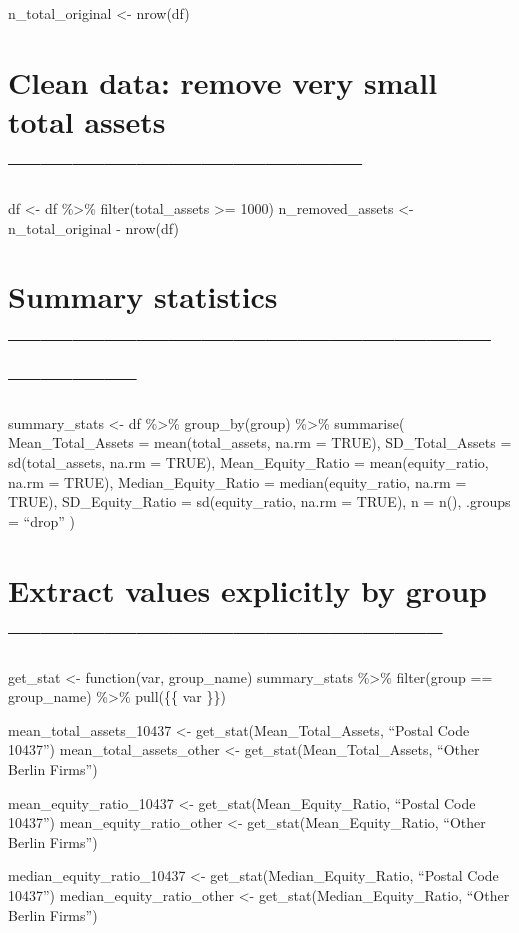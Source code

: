 \documentclass[
]{article}
\begin{document}
n\_total\_original \textless- nrow(df)

\hypertarget{clean-data-remove-very-small-total-assets}{%
\section{Clean data: remove very small total assets
---------------------------------}\label{clean-data-remove-very-small-total-assets}}

df \textless- df \%\textgreater\% filter(total\_assets \textgreater=
1000) n\_removed\_assets \textless- n\_total\_original - nrow(df)

\hypertarget{summary-statistics}{%
\section{Summary statistics
---------------------------------------------------------}\label{summary-statistics}}

summary\_stats \textless- df \%\textgreater\% group\_by(group)
\%\textgreater\% summarise( Mean\_Total\_Assets = mean(total\_assets,
na.rm = TRUE), SD\_Total\_Assets = sd(total\_assets, na.rm = TRUE),
Mean\_Equity\_Ratio = mean(equity\_ratio, na.rm = TRUE),
Median\_Equity\_Ratio = median(equity\_ratio, na.rm = TRUE),
SD\_Equity\_Ratio = sd(equity\_ratio, na.rm = TRUE), n = n(), .groups =
``drop'' )

\hypertarget{extract-values-explicitly-by-group}{%
\section{Extract values explicitly by group
-----------------------------------------}\label{extract-values-explicitly-by-group}}

get\_stat \textless- function(var, group\_name) summary\_stats
\%\textgreater\% filter(group == group\_name) \%\textgreater\% pull(\{\{
var \}\})

mean\_total\_assets\_10437 \textless- get\_stat(Mean\_Total\_Assets,
``Postal Code 10437'') mean\_total\_assets\_other \textless-
get\_stat(Mean\_Total\_Assets, ``Other Berlin Firms'')

mean\_equity\_ratio\_10437 \textless- get\_stat(Mean\_Equity\_Ratio,
``Postal Code 10437'') mean\_equity\_ratio\_other \textless-
get\_stat(Mean\_Equity\_Ratio, ``Other Berlin Firms'')

median\_equity\_ratio\_10437 \textless- get\_stat(Median\_Equity\_Ratio,
``Postal Code 10437'') median\_equity\_ratio\_other \textless-
get\_stat(Median\_Equity\_Ratio, ``Other Berlin Firms'')
\end{document}
